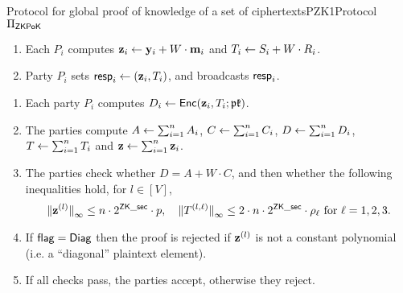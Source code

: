 \begin{Boxfig}{Protocol for global proof of knowledge of a set of ciphertexts}{PZK1}{Protocol $\Pi_{\mathsf{ZKPoK}}$}
\begin{enumerate}
\item Each $P_i$ computes $ \mathbf{z}_i \leftarrow \mathbf{y}_i + W \cdot \mathbf{m}_i$
  and $T_i \leftarrow S_i + W \cdot R_i$. 
\item Party $P_i$ sets $\mathsf{resp}_i \leftarrow \left( \mathbf{z}_i, T_i \right)$, and broadcasts $\mathsf{resp}_i$.
\end{enumerate}

\begin{enumerate}
\item Each party $P_i$ computes $D_i \leftarrow \mathsf{Enc}( \mathbf{z}_i, T_i; \mathfrak{pk})$.
\item The parties compute
$A \leftarrow \sum_{i=1}^n A_i$,
$C \leftarrow \sum_{i=1}^n C_i$,
$D \leftarrow \sum_{i=1}^n D_i$,
$T \leftarrow \sum_{i=1}^n T_i$ and
$\mathbf{z} \leftarrow \sum_{i=1}^n \mathbf{z}_i$. 
\item\label{pizkpok:step:verification} The parties check whether $ D = A + W \cdot C$, and then whether 
  the following inequalities hold, for $l \in [V]$,
\[
    {\Vert \mathbf{z}^{(l)} \Vert}_\infty \le n \cdot 2^{\mathsf{ZK\_sec}} \cdot p,
    \quad
    {\Vert T^{(l,\ell)} \Vert}_\infty \le 2 \cdot n \cdot 2^{\mathsf{ZK\_sec}} \cdot \rho_\ell \mbox{ for } \ell=1,2,3.
\]
\item If $\mathsf{flag}=\mathsf{Diag}$ then the proof is rejected if 
  $\mathbf{z}^{(l)}$ is not a constant polynomial (i.e. a ``diagonal'' plaintext element).
\item If all checks pass, the parties accept, otherwise they reject.
\end{enumerate}
\end{Boxfig}

